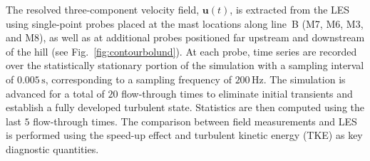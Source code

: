 \documentclass[%
superscriptaddress,
 amsmath,amssymb,
pra,
showkeys,
]{revtex4-2}
\begin{document}
The resolved three-component velocity field, $\boldsymbol{u}(t)$, is extracted from the LES using single-point probes placed at the mast locations along line~B (M7, M6, M3, and M8), as well as at additional probes positioned far upstream and downstream of the hill (see Fig.~\ref{fig:contourbolund}). At each probe, time series are recorded over the statistically stationary portion of the simulation with a sampling interval of $0.005\,\mathrm{s}$, corresponding to a sampling frequency of $200\,\mathrm{Hz}$. The simulation is advanced for a total of $20$ flow-through times to eliminate initial transients and establish a fully developed turbulent state. Statistics are then computed using the last $5$ flow-through times. The comparison between field measurements and LES is performed using the speed-up effect and turbulent kinetic energy (TKE) as key diagnostic quantities.
\end{document}
